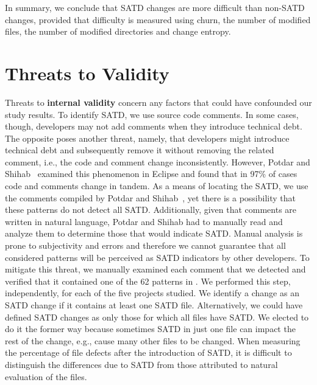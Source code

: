 In summary, we conclude that SATD changes are more difficult than non-SATD changes, provided that difficulty is measured using churn, the number of modified files, the number of modified directories and change entropy.







\section{Threats to Validity}
\label{chap3:sec:threats_to_validity}

Threats  to {\bf  internal validity}  concern any factors that could have confounded our study results. To identify SATD, we use source code comments. In some cases, though, developers may not add comments when they introduce technical debt. The opposite poses another threat, namely, that developers might introduce technical debt and subsequently remove it without removing the related comment, i.e., the code and comment change inconsistently. However, Potdar and Shihab~\cite{ICSM_PotdarS14} examined this phenomenon in Eclipse and found that in 97\% of cases code and comments change in tandem. As a means of locating the SATD, we use the comments compiled by Potdar and Shihab~\cite{ICSM_PotdarS14}, yet there is a possibility that these patterns do not detect all SATD. Additionally, given that comments are written in natural language, Potdar and Shihab had to manually read and analyze them to determine those that would indicate SATD. Manual analysis is prone to subjectivity and errors and therefore we cannot guarantee that all considered patterns will be perceived as SATD indicators by other developers. To mitigate this threat, we manually examined each comment that we detected and verified that it contained one of the 62 patterns in \cite{ICSM_PotdarS14}. We performed this step, independently, for each of the five projects studied. We identify a change as an SATD change if it contains at least one SATD file. Alternatively, we could have defined SATD changes as only those for which all files have SATD. We elected to do it the former way because sometimes SATD in just one file can impact the rest of the change, e.g., cause many other files to be changed. When measuring the percentage of file defects after the introduction of SATD, it is difficult to distinguish the differences due to SATD from those attributed to natural evaluation of the files.



